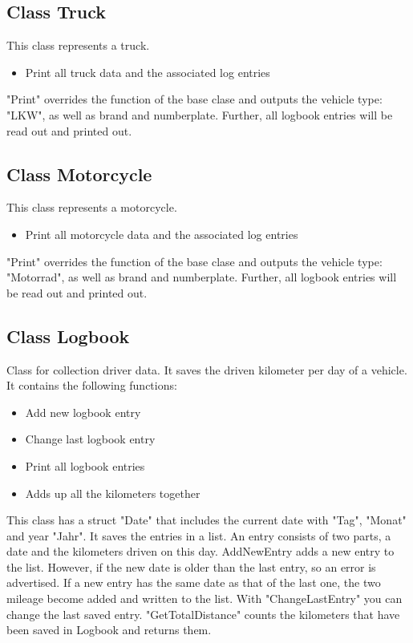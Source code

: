 \subsection{Class Truck}
This class represents a truck.
\begin{itemize}
	\item Print all truck data and the associated log entries
\end{itemize}

"Print" overrides the function of the base clase and outputs the vehicle type: "LKW", as well as brand and numberplate.
Further, all logbook entries will be read out and printed out.

\subsection{Class Motorcycle}
This class represents a motorcycle.
\begin{itemize}
	\item Print all motorcycle data and the associated log entries
\end{itemize}

"Print" overrides the function of the base clase and outputs the vehicle type: "Motorrad", as well as brand and numberplate.
Further, all logbook entries will be read out and printed out.

\subsection{Class Logbook}
Class for collection driver data. It saves the driven kilometer per day of a vehicle.
It contains the following functions:
\begin{itemize}
	\item Add new logbook entry
	\item Change last logbook entry
	\item Print all logbook entries
	\item Adds up all the kilometers together
\end{itemize}

This class has a struct "Date" that includes the current date with "Tag", "Monat" and year "Jahr". It saves the entries in a list. An entry consists of two parts, a date and the kilometers driven on this day. AddNewEntry adds a new entry to the list. However, if the new date is older than the last entry, so an error is advertised. If a new entry has the same date as that of the last one, the two mileage become added and written to the list. With "ChangeLastEntry" you can change the last saved entry. "GetTotalDistance" counts the kilometers that have been saved in Logbook and returns them.


